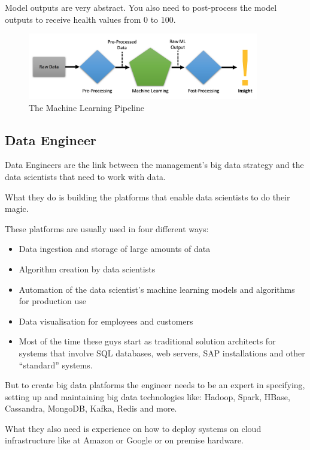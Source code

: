 \documentclass[12pt]{scrartcl} %
\begin{document}
Model outputs are very abstract. You also need to post-process the model outputs to receive health values from 0 to 100.

\begin{figure}[htbp] 
  \centering
     \includegraphics[width=0.9\textwidth]{images/Machine-Learning-Pipeline}
  \caption{The Machine Learning Pipeline}
  \label{fig:Bild1}
\end{figure}

\subsection{Data Engineer}
Data Engineers are the link between the management’s big data strategy and the data scientists that need to work with data.

What they do is building the platforms that enable data scientists to do their magic.

These platforms are usually used in four different ways:

\begin{itemize}
\item  Data ingestion and storage of large amounts of data
\item Algorithm creation by data scientists
\item Automation of the data scientist’s machine learning models and algorithms for production use
\item Data visualisation for employees and customers
\item  Most of the time these guys start as traditional solution architects for systems that involve SQL databases, web servers, SAP installations and other “standard” systems.
\end{itemize}

But to create big data platforms the engineer needs to be an expert in specifying, setting up and maintaining big data technologies like: Hadoop, Spark, HBase, Cassandra, MongoDB, Kafka, Redis and more.

What they also need is experience on how to deploy systems on cloud infrastructure like at Amazon or Google or on premise hardware.
\end{document}
